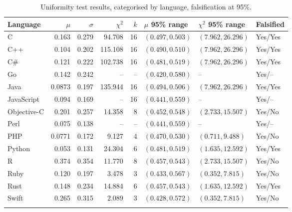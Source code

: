 \documentclass[pdflatex, sn-mathphys, referee]{sn-jnl}%
\theoremstyle{thmstyleone}%
\theoremstyle{thmstyletwo}%
\theoremstyle{thmstylethree}%
\newcommand{\falsified}[2]{#1/#2}
\theoremstyle{thmstyleone}
\begin{document}
\begin{table}[ht]
\begin{center}
\begin{minipage}{\textwidth}
\begin{tabular}{l r r r r l l l}
\toprule%
Language & $\mu$ & $\sigma$ & $\chi^2$ & $k$ & $\mu$ 95\% range & $\chi^2$ 95\% range & Falsified \\
\midrule
C & 0.163 & 0.279 & 94.708 & 16 & $(0.497, 0.503)$ & $(7.962, 26.296)$ & \falsified{Yes}{Yes} \\
C++ & 0.104 & 0.202 & 115.108 & 16 & $(0.490, 0.510)$ & $(7.962, 26.296)$ & \falsified{Yes}{Yes} \\
C\# & 0.121 & 0.222 & 102.738 & 16 & $(0.481, 0.519)$ & $(7.962, 26.296)$ & \falsified{Yes}{Yes} \\
Go & 0.142 & 0.242 & -- & -- & $(0.420, 0.580)$ & -- & \falsified{Yes}{--} \\
Java & 0.0873 & 0.197 & 135.944 & 16 & $(0.494, 0.506)$ & $(7.962, 26.296)$ & \falsified{Yes}{Yes} \\
JavaScript & 0.094 & 0.169 & -- & 16 & $(0.441, 0.559)$ & -- & \falsified{Yes}{--} \\
Objective-C & 0.201 & 0.257 & 14.358 & 8 & $(0.452, 0.548)$ & $(2.733, 15.507)$ & \falsified{Yes}{No} \\
Perl & 0.075 & 0.138 & -- & -- & $(0.441, 0.559)$ & -- & \falsified{Yes}{--} \\
PHP & 0.0771 & 0.172 & 9.127 & 4 & $(0.470, 0.530)$ & $(0.711, 9.488)$ & \falsified{Yes}{No} \\
Python & 0.053 & 0.131 & 24.304 & 6 & $(0.481, 0.519)$ & $(1.635, 12.592)$ & \falsified{Yes}{Yes} \\
R & 0.374 & 0.354 & 11.770 & 8 & $(0.457, 0.543)$ & $(2.733, 15.507)$ & \falsified{Yes}{No} \\
Ruby & 0.120 & 0.197 & 3.478 & 3 & $(0.433, 0.567)$ & $(0.352, 7.815)$ & \falsified{Yes}{No} \\
Rust & 0.148 & 0.234 & 14.884 & 6 & $(0.457, 0.543)$ & $(1.635, 12.592)$ & \falsified{Yes}{Yes} \\
Swift & 0.265 & 0.315 & 2.089 & 3 & $(0.428, 0.572)$ & $(0.352, 7.815)$ & \falsified{Yes}{No} \\
\botrule
\end{tabular}
\caption{\label{table-uniformity}Uniformity test results, categorised by language, falsification at 95\%.}
\end{minipage}
\end{center}
\end{table}
\end{document}
